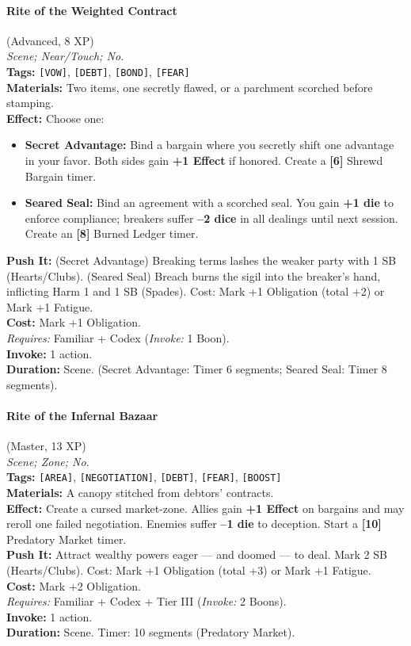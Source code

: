 \paragraph{Rite of the Weighted Contract} (Advanced, 8 XP) \hfill \\
\emph{Scene; Near/Touch; No.} \\
\textbf{Tags:} \texttt{[VOW]}, \texttt{[DEBT]}, \texttt{[BOND]}, \texttt{[FEAR]} \\
\textbf{Materials:} Two items, one secretly flawed, or a parchment scorched before stamping. \\
\textbf{Effect:} Choose one:
\begin{itemize}
  \item \textbf{Secret Advantage:} Bind a bargain where you secretly shift one advantage in your favor. Both sides gain \textbf{+1 Effect} if honored. Create a \textbf{[6]} Shrewd Bargain timer.
  \item \textbf{Seared Seal:} Bind an agreement with a scorched seal. You gain \textbf{+1 die} to enforce compliance; breakers suffer \textbf{--2 dice} in all dealings until next session. Create an \textbf{[8]} Burned Ledger timer.
\end{itemize}
\textbf{Push It:} (Secret Advantage) Breaking terms lashes the weaker party with 1 SB (Hearts/Clubs). (Seared Seal) Breach burns the sigil into the breaker's hand, inflicting Harm 1 and 1 SB (Spades). Cost: Mark +1 Obligation (total +2) or Mark +1 Fatigue. \\
\textbf{Cost:} Mark +1 Obligation. \\
\textit{Requires:} Familiar + Codex (\textit{Invoke:} 1 Boon). \\
\textbf{Invoke:} 1 action. \\
\textbf{Duration:} Scene. (Secret Advantage: Timer 6 segments; Seared Seal: Timer 8 segments).

\paragraph{Rite of the Infernal Bazaar} (Master, 13 XP) \hfill \\
\emph{Scene; Zone; No.} \\
\textbf{Tags:} \texttt{[AREA]}, \texttt{[NEGOTIATION]}, \texttt{[DEBT]}, \texttt{[FEAR]}, \texttt{[BOOST]} \\
\textbf{Materials:} A canopy stitched from debtors' contracts. \\
\textbf{Effect:} Create a cursed market-zone. Allies gain \textbf{+1 Effect} on bargains and may reroll one failed negotiation. Enemies suffer \textbf{--1 die} to deception. Start a \textbf{[10]} Predatory Market timer. \\
\textbf{Push It:} Attract wealthy powers eager --- and doomed --- to deal. Mark 2 SB (Hearts/Clubs). Cost: Mark +1 Obligation (total +3) or Mark +1 Fatigue. \\
\textbf{Cost:} Mark +2 Obligation. \\
\textit{Requires:} Familiar + Codex + Tier III (\textit{Invoke:} 2 Boons). \\
\textbf{Invoke:} 1 action. \\
\textbf{Duration:} Scene. Timer: 10 segments (Predatory Market).

